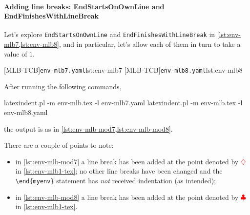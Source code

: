  \paragraph{Adding line breaks: EndStartsOnOwnLine and EndFinishesWithLineBreak}
  \begin{example}
  Let's explore \texttt{EndStartsOnOwnLine} and \texttt{EndFinishesWithLineBreak} in
  \cref{lst:env-mlb7,lst:env-mlb8}, and in particular, let's allow each of them in turn
  to take a value of $1$. 

  \begin{cmhtcbraster}
   [MLB-TCB]{\texttt{env-mlb7.yaml}}{lst:env-mlb7}
   [MLB-TCB]{\texttt{env-mlb8.yaml}}{lst:env-mlb8}
  \end{cmhtcbraster}

  After running the following commands, 

  \begin{commandshell}
latexindent.pl -m env-mlb.tex -l env-mlb7.yaml
latexindent.pl -m env-mlb.tex -l env-mlb8.yaml
\end{commandshell}

  the output is as in \cref{lst:env-mlb-mod7,lst:env-mlb-mod8}.

  \begin{cmhtcbraster}[raster columns=3,
    raster left skip=-3.5cm,
    raster right skip=-2cm,
    raster column skip=.06\linewidth]
  \end{cmhtcbraster}

  There are a couple of points to note:
  \begin{itemize}
   \item in \cref{lst:env-mlb-mod7} a line break has been added at the point denoted by
         $\color{red}\diamondsuit$ in \vref{lst:env-mlb1-tex}; no other line breaks have been
         changed and the \lstinline!\end{myenv}! statement has \emph{not} received
         indentation (as intended);
   \item in \cref{lst:env-mlb-mod8} a line break has been added at the point denoted by
         $\color{red}\clubsuit$ in \vref{lst:env-mlb1-tex}.
  \end{itemize}
  \end{example}

